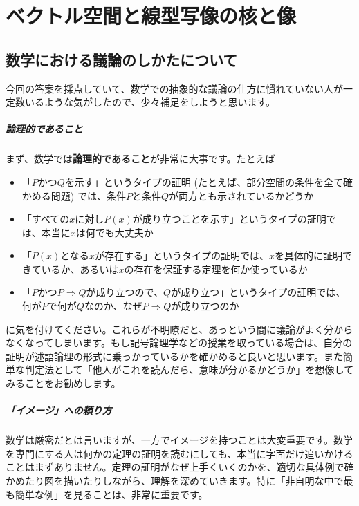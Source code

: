 \chapter{ベクトル空間と線型写像の核と像}




\section{数学における議論のしかたについて}

今回の答案を採点していて、数学での抽象的な議論の仕方に慣れていない人が一定数いるような気がしたので、少々補足をしようと思います。

\paragraph{論理的であること}

まず、数学では\textbf{論理的であること}が非常に大事です。たとえば
\begin{itemize}
\item 「$P$かつ$Q$を示す」というタイプの証明 (たとえば、部分空間の条件を全て確かめる問題) では、条件$P$と条件$Q$が両方とも示されているかどうか
\item 「すべての$x$に対し$P(x)$が成り立つことを示す」というタイプの証明では、本当に$x$は何でも大丈夫か
\item 「$P(x)$となる$x$が存在する」というタイプの証明では、$x$を具体的に証明できているか、あるいは$x$の存在を保証する定理を何か使っているか
\item 「$P$かつ$P\Rightarrow Q$が成り立つので、$Q$が成り立つ」というタイプの証明では、何が$P$で何が$Q$なのか、なぜ$P\Rightarrow Q$が成り立つのか
\end{itemize}
に気を付けてください。これらが不明瞭だと、あっという間に議論がよく分からなくなってしまいます。もし記号論理学などの授業を取っている場合は、自分の証明が述語論理の形式に乗っかっているかを確かめると良いと思います。また簡単な判定法として「他人がこれを読んだら、意味が分かるかどうか」を想像してみることをお勧めします。

\paragraph{「イメージ」への頼り方}

数学は厳密だとは言いますが、一方でイメージを持つことは大変重要です。数学を専門にする人は何かの定理の証明を読むにしても、本当に字面だけ追いかけることはまずありません。定理の証明がなぜ上手くいくのかを、適切な具体例で確かめたり図を描いたりしながら、理解を深めていきます。特に「非自明な中で最も簡単な例」を見ることは、非常に重要です。

